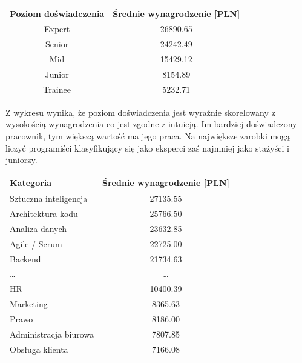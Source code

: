 \documentclass{article}
\begin{document}
\begin{table}[!hbt]
    \centering
    \begin{tabular}{|c|c|}
        \hline
        \textbf{Poziom doświadczenia} & \textbf{Średnie wynagrodzenie [PLN]} \\ \hline
        Expert                        & 26890.65                             \\ \hline
        Senior                        & 24242.49                             \\ \hline
        Mid                           & 15429.12                             \\ \hline
        Junior                        & 8154.89                              \\ \hline
        Trainee                       & 5232.71                              \\ \hline
    \end{tabular}
\end{table}

Z wykresu wynika, że poziom doświadczenia jest wyraźnie skorelowany z wysokością wynagrodzenia co jest zgodne z intuicją.
Im bardziej doświadczony pracownik, tym większą wartość ma jego praca.
Na największe zarobki mogą liczyć programiści klasyfikujący się jako eksperci zaś najmniej jako stażyści i juniorzy.

\begin{table}[H]
    \centering
    \begin{tabular}{|l|c|}
        \hline
        \textbf{Kategoria}    & \textbf{Średnie wynagrodzenie [PLN]} \\ \hline
        Sztuczna inteligencja & 27135.55                             \\ \hline
        Architektura kodu     & 25766.50                             \\ \hline
        Analiza danych        & 23632.85                             \\ \hline
        Agile / Scrum         & 22725.00                             \\ \hline
        Backend               & 21734.63                             \\ \hline
        \dots                 & \dots                                \\ \hline
        HR                    & 10400.39                             \\ \hline
        Marketing             & 8365.63                              \\ \hline
        Prawo                 & 8186.00                              \\ \hline
        Administracja biurowa & 7807.85                              \\ \hline
        Obsługa klienta       & 7166.08                              \\ \hline
    \end{tabular}
\end{table}
\end{document}
